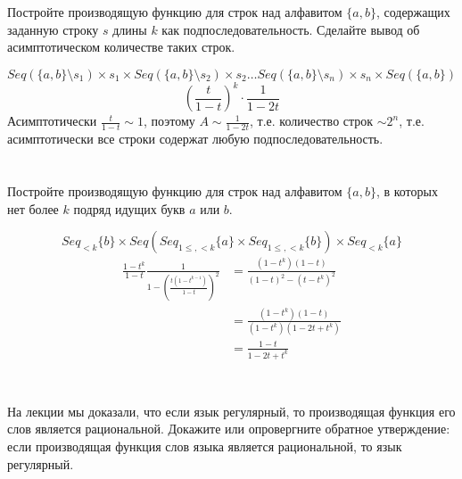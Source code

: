 \section{}
Постройте производящую функцию для строк над алфавитом $\{a, b\}$, содержащих заданную строку $s$ длины $k$ как подпоследовательность. Сделайте вывод об асимптотическом количестве таких строк.


\[Seq(\{a,b\} \setminus s_1) \times s_1 \times Seq(\{a,b\} \setminus s_2) \times s_2 \dots Seq(\{a,b\} \setminus s_n) \times s_n \times Seq(\{a, b\})\]
\[\left( \frac{t}{1 - t} \right)^k \cdot \frac{1}{1 - 2t}\]
Асимптотически \(\frac{t}{1 - t} \sim 1\), поэтому \(A \sim \frac{1}{1 - 2t}\), т.е. количество строк \(\sim 2^n\), т.е. асимптотически все строки содержат любую подпоследовательность.




\section{}
Постройте производящую функцию для строк над алфавитом $\{a, b\}$, в которых нет более $k$ подряд идущих букв $a$ или $b$.

\[Seq_{ < k} \{b\} \times Seq(Seq_{1 \leq, < k} \{a\} \times Seq_{1 \leq, < k} \{b\}) \times Seq_{ < k} \{a\} \]
\begin{align*}
    \frac{1 - t^k}{1 - t} \frac{1}{1 - \left(\frac{t(1 - t^{k - 1})}{1 - t}\right)^2} & = \frac{(1 - t^k)(1 - t)}{(1 - t)^2 - (t - t^k)^2} \\
                                                                                      & = \frac{(1 - t^k)(1 - t)}{(1 - t^k)(1 - 2t + t^k)} \\
                                                                                      & = \frac{1 - t}{1 - 2t + t^k}                       \\
\end{align*}

\section{}
На лекции мы доказали, что если язык регулярный, то производящая функция его слов является рациональной. Докажите или опровергните обратное утверждение: если производящая функция слов языка является рациональной, то язык регулярный.

